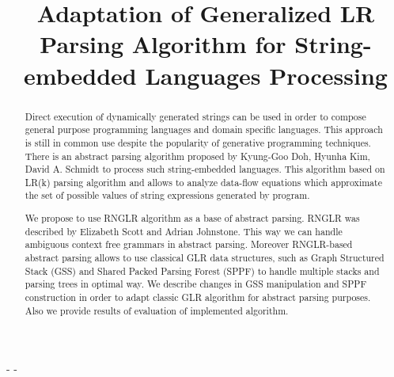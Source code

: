 \documentclass{sigplanconf}
\begin{document}
\setlength{\pdfpageheight}{\paperheight}
\setlength{\pdfpagewidth}{\paperwidth}






\title{Adaptation of Generalized LR Parsing Algorithm for String-embedded Languages Processing}

\authorinfo{-}
           {-}
           {-}



\maketitle

\begin{abstract}
Direct execution of dynamically generated strings can be used in order to compose general purpose programming languages and domain specific languages. This approach is still in common use despite the popularity of generative programming techniques. There is an abstract parsing algorithm proposed by Kyung-Goo Doh, Hyunha Kim, David A. Schmidt to process such string-embedded languages. This algorithm based on LR(k) parsing algorithm and allows to analyze data-flow equations which approximate the set of possible values of string expressions generated by program.

We propose to use RNGLR algorithm as a base of abstract parsing. RNGLR was described by Elizabeth Scott and Adrian Johnstone. This way we can handle ambiguous context free grammars in abstract parsing. Moreover  RNGLR-based abstract parsing allows to use classical GLR data structures, such as Graph Structured Stack (GSS) and Shared Packed Parsing Forest (SPPF) to handle multiple stacks and parsing trees in optimal way. We describe changes in GSS manipulation and SPPF construction in order to adapt classic GLR algorithm for abstract parsing purposes. Also we provide results of evaluation of implemented algorithm. 
\end{abstract}
\end{document}
